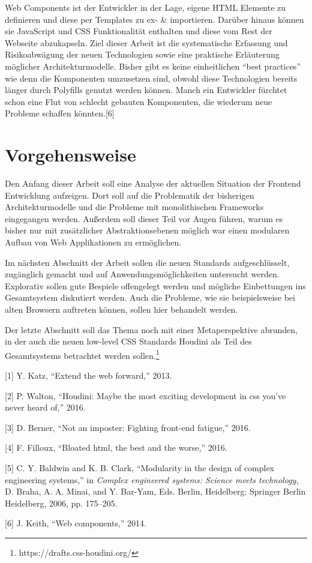 Web Components ist der Entwickler in der Lage, eigene HTML Elemente zu
definieren und diese per Templates zu ex- \& importieren. Darüber hinaus
können sie JavaScript und CSS Funktionalität enthalten und diese vom
Rest der Webseite abzukapseln. Ziel dieser Arbeit ist die systematische
Erfassung und Risikoabwägung der neuen Technologien sowie eine
praktische Erläuterung möglicher Architekturmodelle. Bisher gibt es
keine einheitlichen ``best practices'' wie denn die Komponenten
umzusetzen sind, obwohl diese Technologien bereits länger durch
Polyfills genutzt werden können. Manch ein Entwickler fürchtet schon
eine Flut von schlecht gebauten Komponenten, die wiederum neue Probleme
schaffen könnten.{[}6{]}

\section{Vorgehensweise}\label{vorgehensweise}

Den Anfang dieser Arbeit soll eine Analyse der aktuellen Situation der
Frontend Entwicklung aufzeigen. Dort soll auf die Problematik der
bisherigen Architekturmodelle und die Probleme mit monolithischen
Frameworks eingegangen werden. Außerdem soll dieser Teil vor Augen
führen, warum es bisher nur mit zusätzlicher Abstraktionsebenen möglich
war einen modularen Aufbau von Web Applikationen zu ermöglichen.

Im nächsten Abschnitt der Arbeit sollen die neuen Standards
aufgeschlüsselt, zugänglich gemacht und auf Anwendungsmöglichkeiten
untersucht werden. Explorativ sollen gute Bespiele offengelegt werden
und mögliche Einbettungen ins Gesamtsystem diskutiert werden. Auch die
Probleme, wie sie beispielsweise bei alten Browsern auftreten können,
sollen hier behandelt werden.

Der letzte Abschnitt soll das Thema noch mit einer Metaperspektive
abrunden, in der auch die neuen low-level CSS Standards Houdini als Teil
des Gesamtsystems betrachtet werden sollen.\footnote{https://drafts.css-houdini.org/}

\hypertarget{refs}{}
\hypertarget{ref-Katz2013}{}
{[}1{]} Y. Katz, ``Extend the web forward,'' 2013.

\hypertarget{ref-Walton2016}{}
{[}2{]} P. Walton, ``Houdini: Maybe the most exciting development in css
you've never heard of,'' 2016.

\hypertarget{ref-Berner2016}{}
{[}3{]} D. Berner, ``Not an imposter: Fighting front-end fatigue,''
2016.

\hypertarget{ref-Filloux2016}{}
{[}4{]} F. Filloux, ``Bloated html, the best and the worse,'' 2016.

\hypertarget{ref-Baldwin2006}{}
{[}5{]} C. Y. Baldwin and K. B. Clark, ``Modularity in the design of
complex engineering systems,'' in \emph{Complex engineered systems:
Science meets technology}, D. Braha, A. A. Minai, and Y. Bar-Yam, Eds.
Berlin, Heidelberg: Springer Berlin Heidelberg, 2006, pp. 175--205.

\hypertarget{ref-Keith2014}{}
{[}6{]} J. Keith, ``Web components,'' 2014.
